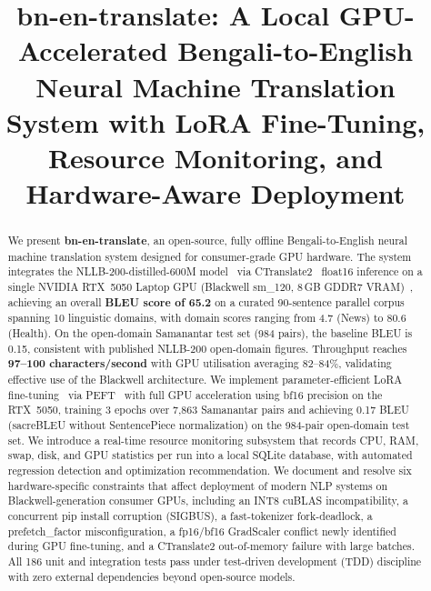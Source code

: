 \documentclass[conference]{IEEEtran}
\newcommand{\POSTFTBLEU}{0.17}
\begin{document}

\title{bn-en-translate: A Local GPU-Accelerated Bengali-to-English Neural
Machine Translation System with LoRA Fine-Tuning, Resource Monitoring,
and Hardware-Aware Deployment}

\author{
}

\maketitle

\begin{abstract}
We present \textbf{bn-en-translate}, an open-source, fully offline Bengali-to-English
neural machine translation system designed for consumer-grade GPU hardware.
The system integrates the NLLB-200-distilled-600M model~\cite{nllb2022} via
CTranslate2~\cite{ctranslate2_klein} float16 inference on a single NVIDIA RTX~5050
Laptop GPU (Blackwell sm\_120, 8\,GB GDDR7 VRAM)~\cite{nvidia_blackwell},
achieving an overall \textbf{BLEU score of 65.2} on a curated 90-sentence parallel
corpus spanning 10 linguistic domains, with domain scores ranging from 4.7 (News)
to 80.6 (Health).
On the open-domain Samanantar test set (984 pairs), the baseline BLEU is 0.15,
consistent with published NLLB-200 open-domain figures.
Throughput reaches \textbf{97--100 characters/second} with GPU utilisation averaging
82--84\%, validating effective use of the Blackwell architecture.
We implement parameter-efficient LoRA fine-tuning~\cite{hu2021lora} via
PEFT~\cite{peft2022} with full GPU acceleration using bf16 precision on the RTX~5050,
training 3 epochs over 7,863 Samanantar pairs and achieving \POSTFTBLEU{} BLEU
(sacreBLEU without SentencePiece normalization)
on the 984-pair open-domain test set.
We introduce a real-time resource monitoring subsystem that records CPU, RAM, swap,
disk, and GPU statistics per run into a local SQLite database, with automated
regression detection and optimization recommendation.
We document and resolve six hardware-specific constraints that affect deployment of
modern NLP systems on Blackwell-generation consumer GPUs, including an INT8 cuBLAS
incompatibility, a concurrent pip install corruption (SIGBUS), a fast-tokenizer
fork-deadlock, a prefetch\_factor misconfiguration, a fp16/bf16 GradScaler
conflict newly identified during GPU fine-tuning, and a CTranslate2 out-of-memory
failure with large batches.
All 186 unit and integration tests pass under test-driven development (TDD) discipline
with zero external dependencies beyond open-source models.
\end{abstract}
\end{document}
